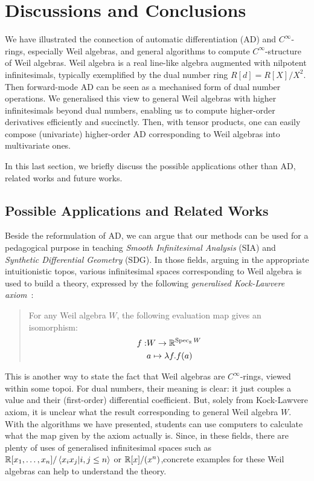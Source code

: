 \documentclass[%
  sigconf,authorversion,screen]{acmart}
\begin{document}
\section{Discussions and Conclusions}\label{sec:concl}
We have illustrated the connection of automatic differentiation (AD) and $C^\infty$-rings, especially Weil algebras, and general algorithms to compute $C^\infty$-structure of Weil algebras.
Weil algebra is a real line-like algebra augmented with nilpotent infinitesimals, typically exemplified by the dual number ring $R[d] = R[X]/X^2$.
Then forward-mode AD can be seen as a mechanised form of dual number operations.
We generalised this view to general Weil algebras with higher infinitesimals beyond dual numbers, enabling us to compute higher-order derivatives efficiently and succinctly.
Then, with tensor products, one can easily compose (univariate) higher-order AD corresponding to Weil algebras into multivariate ones.

In this last section, we briefly discuss the possible applications other than AD, related works and future works.

\subsection{Possible Applications and Related Works}
Beside the reformulation of AD, we can argue that our methods can be used for a pedagogical purpose in teaching \emph{Smooth Infinitesimal Analysis} (SIA) and \emph{Synthetic Differential Geometry} (SDG).
In those fields, arguing in the appropriate intuitionistic topos, various infinitesimal spaces corresponding to Weil algebra is used to build a theory, expressed by the following \emph{generalised Kock-Lawvere axiom}~\cite{Moerdijk:1991aa}:

\begin{quote}
  For any Weil algebra $W$, the following evaluation map gives an isomorphism:
  \begin{align*}
    f: &W \to   \mathbb{R}^{\mathop{\mathrm{Spec}}_{\mathbb{R}}{W}}\\
       &a \mapsto \lambda f. f(a)
  \end{align*}
\end{quote}
This is another way to state the fact that Weil algebras are $C^\infty$-rings, viewed within some topoi.
For dual numbers, their meaning is clear: it just couples a value and their (first-order) differential coefficient.
But, solely from Kock-Lawvere axiom, it is unclear what the result corresponding to general Weil algebra $W$.
With the algorithms we have presented, students can use computers to calculate what the map given by the axiom actually is.
Since, in these fields, there are plenty of uses of generalised infinitesimal spaces such as $\mathbb{R}[x_1,\dots, x_n]/\braket{x_i x_j | i, j \leq n}$ or $\mathbb{R}[x]/(x^n)$,concrete examples for these Weil algebras can help to understand the theory.
\end{document}
